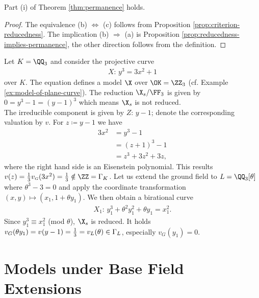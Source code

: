 \begin{corollary} \label{cor:permanence-part-i}
    Part (i) of Theorem \ref{thm:permanence} holds.
\end{corollary}

\begin{proof}
    The equivalence (b) $\iff$ (c) follows from Proposition \ref{prop:criterion-reducedness}.
    The implication (b) $\Rightarrow$ (a) is Proposition \ref{prop:reducedness-implies-permanence}, the other direction follows from the definition.
\end{proof}


\begin{example}
    Let $K = \QQ_3$ and consider the projective curve
    \begin{align}
        X: \, y^3 = 3x^2 + 1
    \end{align}
    over $K$.
    The equation defines a model $\X$ over $\OK=\ZZ_3$ (cf. Example \ref{ex:model-of-plane-curve}).
    The reduction $\X_s/\FF_3$ is given by $0 = y^3 - 1 = (y - 1)^3$ which means $\X_s$ is not reduced. \\
    The irreducible component is given by $Z: \, y-1$; denote the corresponding valuation by $v$.
    For $z \coloneqq y - 1$ we have
    \begin{align*}
        3x^2 &= y^3 - 1 \\
            &= (z+1)^3 - 1 \\
            &= z^3 + 3z^2 + 3z,
    \end{align*}
    where the right hand side is an Eisenstein polynomial.
    This results $v(z) = \frac{1}{3}v_{\scriptscriptstyle G}(3x^2) = \frac{1}{3} \notin \ZZ = \Gamma_K$.
    Let us extend the ground field to $L = \QQ_3[\theta]$ where $\theta^3 - 3 = 0$ and apply the coordinate transformation
    $(x,y) \mapsto (x_1, 1+ \theta y_1)$.
    We then obtain a birational curve
    \begin{align}
        X_1: \, y_1^3 + \theta^2 y_1^2 + \theta y_1 = x_1^2.
    \end{align}
    Since $y_1^3 \equiv x_1^2$ (mod $\theta$), $\X_s$ is reduced.
    It holds $v_G(\theta y_1) = v_{\scriptscriptstyle}(y - 1) = \frac{1}{3} = v_L(\theta) \in \Gamma_L$, especially $v_{\scriptscriptstyle G}(y_1) = 0$.
\end{example}


\section{Models under Base Field Extensions}\label{sec:models-under-base-field-extensions}

